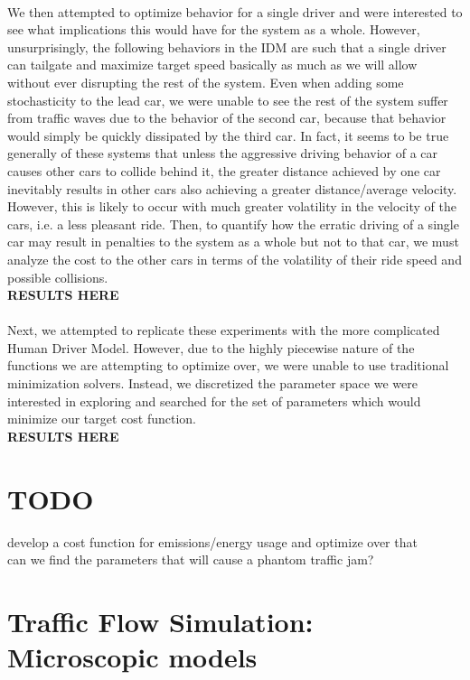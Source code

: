 \documentclass[12pt]{article}
\begin{document}
\paragraph{}We then attempted to optimize behavior for a single driver and were interested to see what implications this would have for the system as a whole. However, unsurprisingly, the following behaviors in the IDM are such that a single driver can tailgate and maximize target speed basically as much as we will allow without ever disrupting the rest of the system. Even when adding some stochasticity to the lead car, we were unable to see the rest of the system suffer from traffic waves due to the behavior of the second car, because that behavior would simply be quickly dissipated by the third car. In fact, it seems to be true generally of these systems that unless the aggressive driving behavior of a car causes other cars to collide behind it, the greater distance achieved by one car inevitably results in other cars also achieving a greater distance/average velocity. However, this is likely to occur with much greater volatility in the velocity of the cars, i.e. a less pleasant ride. Then, to quantify how the erratic driving of a single car may result in penalties to the system as a whole but not to that car, we must analyze the cost to the other cars in terms of the volatility of their ride speed and possible collisions.\\
\textbf{RESULTS HERE}
\paragraph{}Next, we attempted to replicate these experiments with the more complicated Human Driver Model. However, due to the highly piecewise nature of the functions we are attempting to optimize over, we were unable to use traditional minimization solvers. Instead, we discretized the parameter space we were interested in exploring and searched for the set of parameters which would minimize our target cost function. \\
\textbf{RESULTS HERE}
\section{TODO}
develop a cost function for emissions/energy usage and optimize over that \\
can we find the parameters that will cause a phantom traffic jam?



\section{Traffic Flow Simulation: Microscopic models}
\end{document}
